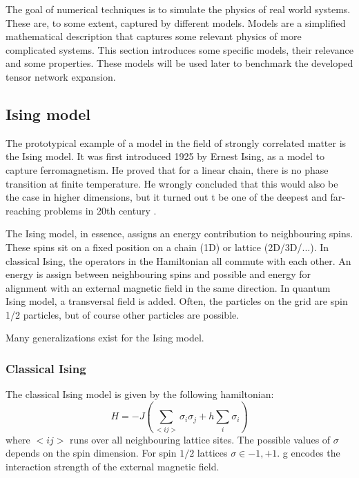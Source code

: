 The goal of numerical techniques is to simulate the physics of real world systems. These are, to some extent, captured by different models. Models are a simplified mathematical description that captures some relevant physics of more complicated systems. This section introduces some specific models, their relevance and some properties. These models will be used later to benchmark the developed tensor network expansion.

\subsection{Ising model}

The prototypical example of a model in the field of strongly correlated matter is the Ising model. It was first introduced 1925 by Ernest Ising, as a model to capture ferromagnetism. He proved that for a linear chain, there is no phase transition at finite temperature. He wrongly concluded that this would also be the case in higher dimensions, but it turned out t be one of the deepest and far-reaching problems in 20th century \cite{Taroni2015}.

The Ising model, in essence, assigns an energy contribution to neighbouring spins. These spins sit on a fixed position on a chain (1D) or lattice (2D/3D/...). In classical Ising, the operators in the Hamiltonian all commute with each other. An energy is assign between neighbouring spins and possible and energy for alignment with an external magnetic field in the same direction. In quantum Ising model, a transversal field is added. Often, the particles on the grid are spin 1/2 particles, but of course other particles are possible.

Many generalizations exist for the Ising model. 

\subsubsection{Classical Ising}

The classical Ising model is given by the following hamiltonian:
\begin{equation}
    H = -J \left (  \sum_{<i j>} \sigma_i \sigma_j + h \sum_i \sigma_i \right )
\end{equation}
where $<i j>$ runs over all neighbouring lattice sites. The possible values of $\sigma$ depends on the spin dimension. For spin $1/2$ lattices $\sigma \in {-1,+1}$. g encodes the interaction strength of the external magnetic field.

